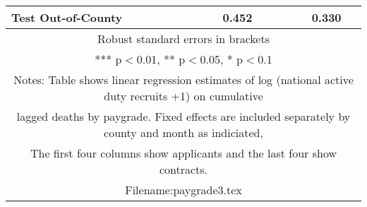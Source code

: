 \documentclass[]{article}
\begin{document}
\begin{tabular}{lcccc}
 Test Out-of-County &  & 0.452 &  & 0.330 \\ \hline
\multicolumn{5}{c}{ Robust standard errors in brackets} \\
\multicolumn{5}{c}{ *** p$<$0.01, ** p$<$0.05, * p$<$0.1} \\
\multicolumn{5}{c}{ Notes: Table shows linear regression estimates of log (national active duty recruits +1) on cumulative} \\
\multicolumn{5}{c}{ lagged deaths by paygrade. Fixed effects are included separately by county and month as indiciated,} \\
\multicolumn{5}{c}{ The first four columns show applicants and the last four show contracts.} \\
\multicolumn{5}{c}{ Filename:paygrade3.tex} \\
\end{tabular}
\end{document}
